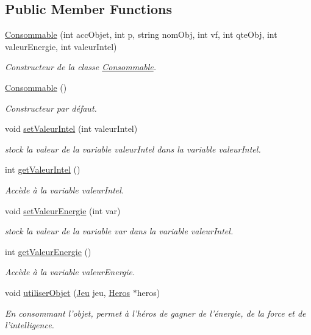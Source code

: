 \subsection*{Public Member Functions}
\begin{DoxyCompactItemize}
\item 
\hyperlink{class_consommable_a690f64c7cd8eaa64f4db98f170706864}{Consommable} (int acc\-Objet, int p, string nom\-Obj, int vf, int qte\-Obj, int valeur\-Energie, int valeur\-Intel)
\begin{DoxyCompactList}\small\item\em Constructeur de la classe \hyperlink{class_consommable}{Consommable}. \end{DoxyCompactList}\item 
\hyperlink{class_consommable_ad87f63d0fef7c1424270bdf334857d4d}{Consommable} ()
\begin{DoxyCompactList}\small\item\em Constructeur par défaut. \end{DoxyCompactList}\item 
void \hyperlink{class_consommable_a23a0a6e80f5cb5ff1269514389d70413}{set\-Valeur\-Intel} (int valeur\-Intel)
\begin{DoxyCompactList}\small\item\em stock la valeur de la variable valeur\-Intel dans la variable valeur\-Intel. \end{DoxyCompactList}\item 
int \hyperlink{class_consommable_aafb68bb944bfc5c3fee60d8d3ffba241}{get\-Valeur\-Intel} ()
\begin{DoxyCompactList}\small\item\em Accède à la variable valeur\-Intel. \end{DoxyCompactList}\item 
void \hyperlink{class_consommable_ac70bcac8ceed2be2a4b09a36874bc752}{set\-Valeur\-Energie} (int var)
\begin{DoxyCompactList}\small\item\em stock la valeur de la variable var dans la variable valeur\-Intel. \end{DoxyCompactList}\item 
int \hyperlink{class_consommable_a14eacc0565fc9afb5b2f2b510f8daff7}{get\-Valeur\-Energie} ()
\begin{DoxyCompactList}\small\item\em Accède à la variable valeur\-Energie. \end{DoxyCompactList}\item 
void \hyperlink{class_consommable_ab2105902385a78cbca8496fdde262d2f}{utiliser\-Objet} (\hyperlink{class_jeu}{Jeu} jeu, \hyperlink{class_heros}{Heros} $\ast$heros)
\begin{DoxyCompactList}\small\item\em En consommant l'objet, permet à l'héros de gagner de l'énergie, de la force et de l'intelligence. \end{DoxyCompactList}\end{DoxyCompactItemize}
